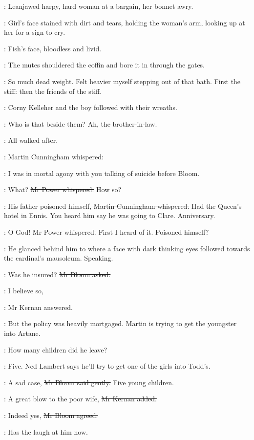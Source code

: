 \BloomInt:
Leanjawed harpy, hard woman at a bargain, her bonnet awry.

:
Girl's face stained with dirt and tears,
holding the woman's arm, looking up at her for a sign to cry.

\BloomInt:
Fish's face, bloodless and livid.

:
The mutes shouldered the coffin and bore it in through the gates.

\BloomInt:
So much dead weight.
Felt heavier myself stepping out of that bath.
First the stiff:
then the friends of the stiff.

:
Corny Kelleher and the boy followed with their wreaths.

\BloomInt:
Who is that beside them?
Ah, the brother-in-law.

:
All walked after.

:
Martin Cunningham whispered:

\cunningham:
I was in mortal agony with you talking of suicide before Bloom.

\power:
What?
\sout{Mr Power whispered.}
How so?

\cunningham:
His father poisoned himself,
\sout{Martin Cunningham whispered.}
Had the Queen's hotel in Ennis.
You heard him say he was going to Clare.
Anniversary.

\power:
O God!
\sout{Mr Power whispered.}
First I heard of it.
Poisoned himself?

:
He glanced behind him to where
a face with dark thinking eyes followed towards the cardinal's mausoleum.
Speaking.

\Bloom:
Was he insured?
\sout{Mr Bloom asked.}

:
I believe so,

:
Mr Kernan answered.

:
But the policy was heavily mortgaged.
Martin is trying to get the youngster into Artane.

\Bloom:
How many children did he leave?

:
Five.
Ned Lambert says he'll try to get one of the girls into Todd's.

\Bloom:
A sad case,
\sout{Mr Bloom said gently.}
Five young children.

:
A great blow to the poor wife,
\sout{Mr Kernan added.}

\Bloom:
Indeed yes,
\sout{Mr Bloom agreed.}

\BloomInt:
Has the laugh at him now.

